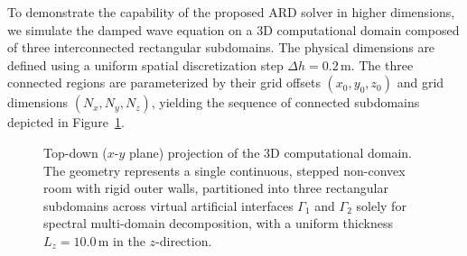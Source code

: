 \documentclass{Configuration_Files/PoliMi3i_thesis}
\begin{document}
To demonstrate the capability of the proposed ARD solver in higher dimensions, we simulate the damped wave equation on a 3D computational domain composed of three interconnected rectangular subdomains. The physical dimensions are defined using a uniform spatial discretization step $\Delta h = 0.2$\,m. The three connected regions are parameterized by their grid offsets $(x_0, y_0, z_0)$ and grid dimensions $(N_x, N_y, N_z)$, yielding the sequence of connected subdomains depicted in Figure~\ref{fig:ard_3d_geometry}. 
\begin{figure}[H]
    \centering
    \caption{Top-down ($x$-$y$ plane) projection of the 3D computational domain. The geometry represents a single continuous, stepped non-convex room with rigid outer walls, partitioned into three rectangular subdomains across virtual artificial interfaces $\Gamma_1$ and $\Gamma_2$ solely for spectral multi-domain decomposition, with a uniform thickness $L_z = 10.0$\,m in the $z$-direction.}
    \label{fig:ard_3d_geometry}
\end{figure}
\end{document}
